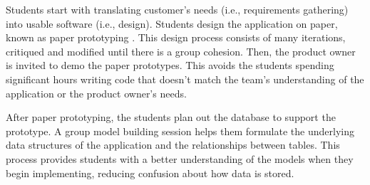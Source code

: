 
Students start with translating customer's needs (i.e., requirements gathering) into usable software (i.e., design). Students design the application on paper, known as paper prototyping \cite{2003paperPrototype}. This design process consists of many iterations, critiqued and modified until there is a group cohesion. Then, the product owner is invited to demo the paper prototypes. This avoids the students spending significant hours writing code that doesn't match the team's understanding of the application or the product owner's needs.


After paper prototyping, the students plan out the database to support the prototype. A group model building session helps them formulate the underlying data structures of the application and the relationships between tables. This process provides students with a better understanding of the models when they begin implementing, reducing confusion about how data is stored.  %

